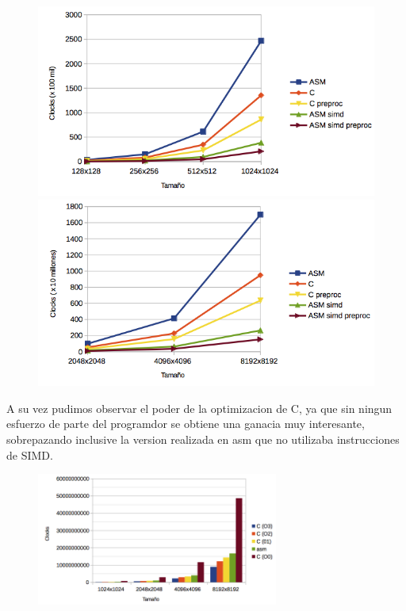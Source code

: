 \begin{figure}[!h]
	\centering
	\begin{minipage}{.5\textwidth}
		\centering
		\includegraphics[width=\linewidth]{imgs/ldrTotales1.png}
	\end{minipage}\hfill
	\begin{minipage}{.5\textwidth}
		\centering
		\includegraphics[width=\linewidth]{imgs/ldrTotales2.png}
	\end{minipage}\hfill
\end{figure}
 

\newpage

A su vez pudimos observar el poder de la optimizacion de C, ya que sin ningun esfuerzo de parte del programdor se obtiene una ganacia muy interesante, sobrepazando inclusive la version realizada en asm que no utilizaba instrucciones de SIMD.


\begin{figure}[!h]
	\centering
\includegraphics[width=300px]{imgs/ldrOptC.png}
\end{figure}




